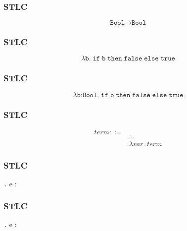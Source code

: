 \documentclass{beamer}
\newcommand{\ifte}[3]{\texttt{if} \; {#1} \; \texttt{then} \; {#2} \; \texttt{else} \; {#3}}
\newcommand{\lamann}[3]{\lambda {#1} \texttt{:} {#2} \texttt{.} \; {#3}}
\newcommand{\lam}[2]{\lambda {#1} \texttt{.} \; {#2}}
\newcommand{\true}[0]{\texttt{true}}
\newcommand{\false}[0]{\texttt{false}}
\newcommand{\Bool}[0]{\texttt{Bool}}
\begin{document}
\begin{frame}
  \frametitle{STLC}


  \[
  \Bool \rightarrow \Bool
  \]

\end{frame}

\begin{frame}
  \frametitle{STLC}


  \[
  \lam{\texttt{b}}{\ifte{\texttt{b}}{\false}{\true}}
  \]

\end{frame}

\begin{frame}
  \frametitle{STLC}


  \[
  \lamann{\texttt{b}}{\Bool}{\ifte{\texttt{b}}{\false}{\true}}
  \]

\end{frame}

\begin{frame}
  \frametitle{STLC}


  \[
  \begin{aligned}
  term ::= \\
   ~ & \dots \\
   ~ & \lam{var}{term}
  \end{aligned}
  \]

\end{frame}

\begin{frame}
  \frametitle{STLC}


  \infrule[T-lam]
    {\phantom{ \Gamma , \; x : \; ?? } \vdash \phantom{ e : T }}
    {\Gamma \vdash \lam{x}{e} \;\; : \phantom{ \;\; ? \rightarrow T }}

\end{frame}

\begin{frame}
  \frametitle{STLC}

  \infrule[T-lam]
    {\Gamma \phantom{, \; x : \; ?? } \vdash \phantom{ e : T }}
    {\Gamma \vdash \lam{x}{e} \;\; : \phantom{ \;\; ? \rightarrow T }}

\end{frame}
\end{document}

